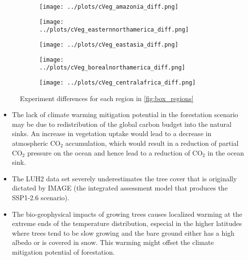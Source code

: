\documentclass[]{article}
\begin{document}
\begin{figure}[H]
    \centering
    \begin{subfigure}[b]{0.4\linewidth}
        \texttt{[image: ../plots/cVeg\_amazonia\_diff.png]}
    \end{subfigure}

    \begin{subfigure}[b]{0.4\linewidth}
        \texttt{[image: ../plots/cVeg\_easternnorthamerica\_diff.png]}
    \end{subfigure}
    \begin{subfigure}[b]{0.4\linewidth}
        \texttt{[image: ../plots/cVeg\_eastasia\_diff.png]}
    \end{subfigure}
    \begin{subfigure}[b]{0.4\linewidth}
        \texttt{[image: ../plots/cVeg\_borealnorthamerica\_diff.png]}
    \end{subfigure}
    \begin{subfigure}[b]{0.4\linewidth}
        \texttt{[image: ../plots/cVeg\_centralafrica\_diff.png]}
    \end{subfigure}
    \caption{Experiment differences for each region in \ref{fig:box_regions}}
    \label{fig:aus_region_cveg_tas}
\end{figure}

\begin{itemize}
    \item The lack of climate warming mitigation potential in the forestation scenario may be due to redistribution of the global carbon budget into the natural sinks.
        An increase in vegetation uptake would lead to a decrease in atmospheric CO$_2$ accumulation, which would result in a reduction of partial CO$_2$ pressure on the ocean and hence lead to a reduction of CO$_2$ in the ocean sink.
    \item The LUH2 data set severely underestimates the tree cover that is originally dictated by IMAGE (the integrated assessment model that produces the SSP1-2.6 scenario).
    \item The bio-geophysical impacts of growing trees causes localized warming at the extreme ends of the temperature distribution, especial in the higher latitudes where trees tend to be slow growing and the bare ground either has a high albedo or is covered in snow. This warming might offset the climate mitigation potential of forestation.
\end{itemize}
\end{document}
